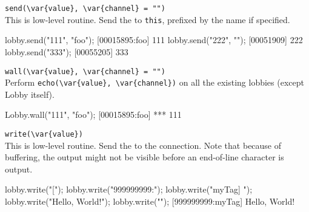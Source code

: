 \begin{urbiscriptapi}
\item \lstinline|send(\var{value}, \var{channel} = "")|\\
  This is low-level routine.  Send the  
  to \lstinline|this|, prefixed by the 
   name if specified.
\begin{urbiscript}
lobby.send("111", "foo");
[00015895:foo] 111
lobby.send("222", "");
[00051909] 222
lobby.send("333");
[00055205] 333
\end{urbiscript}

\item \lstinline|wall(\var{value}, \var{channel} = "")|\\
  Perform \lstinline|echo(\var{value}, \var{channel})| on all the
  existing lobbies (except Lobby itself).
\begin{urbiscript}[firstnumber=1]
Lobby.wall("111", "foo");
[00015895:foo] *** 111
\end{urbiscript}

\item \lstinline|write(\var{value})|\\
  This is low-level routine.  Send the  
  to the connection.  Note that because of buffering, the output might
  not be visible before an end-of-line character is output.
\begin{urbiscript}
lobby.write("[");
lobby.write("999999999:");
lobby.write("myTag] ");
lobby.write("Hello, World!");
lobby.write("\n");
[999999999:myTag] Hello, World!
\end{urbiscript}
\end{urbiscriptapi}

